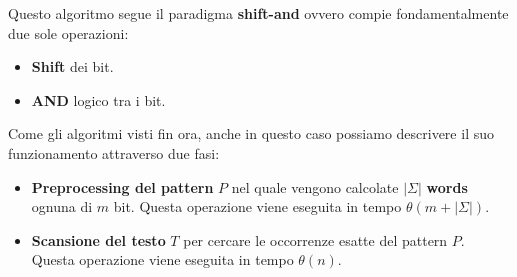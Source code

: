 Questo algoritmo segue il paradigma \textbf{shift-and} ovvero compie fondamentalmente
due sole operazioni:
\begin{itemize}
    \item \textbf{Shift} dei bit.
    \item \textbf{AND} logico tra i bit.
\end{itemize}
Come gli algoritmi visti fin ora, anche in questo caso possiamo descrivere il suo
funzionamento attraverso due fasi:
\begin{itemize}
    \item \textbf{Preprocessing del pattern} $P$ nel quale vengono calcolate
          $|\Sigma|$ \textbf{words} ognuna di $m$ bit. Questa operazione viene
          eseguita in tempo $\theta(m + |\Sigma|)$.
    \item \textbf{Scansione del testo} $T$ per cercare le occorrenze esatte del
          pattern $P$. Questa operazione viene eseguita in tempo $\theta(n)$.
\end{itemize}
